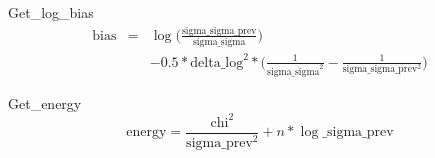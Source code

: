 Get\_log\_bias
\begin{eqnarray}
\mathrm{bias} & =&  \log{}\Bigg( \frac{\mathrm{sigma\_sigma\_prev}}{\mathrm{sigma\_sigma}}\Bigg)\\
&& - 0.5 * \mathrm{delta\_log}^2*\Bigg( \frac{1}{\mathrm{sigma\_sigma}^2} - \frac{1}{\mathrm{sigma\_sigma\_prev^2}}\Bigg)
\end{eqnarray}

Get\_energy
\begin{equation}
\mathrm{energy} = \frac{\mathrm{chi}^2}{\mathrm{sigma\_prev}^2} + n*\log{}\mathrm{\_sigma\_prev}
\end{equation}

\begin{equation}
\end{equation}

\begin{equation}
\end{equation}

\begin{equation}
\end{equation}

\begin{equation}
\end{equation}

%


